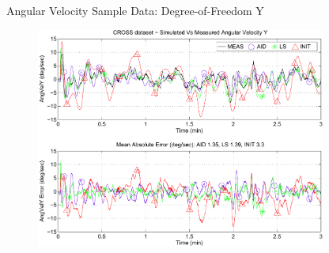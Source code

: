   

%    
  
\begin{frame}{Angular Velocity Sample Data: Degree-of-Freedom Y}
    
    \begin{center}
      \begin{figure}[htbp]
        \begin{center}
          \includegraphics[width=3.75in]{./pres/images/crossAID_angVelExDOF_all}
        \end{center}
      \end{figure}
    \end{center}
   
\end{frame}


    
